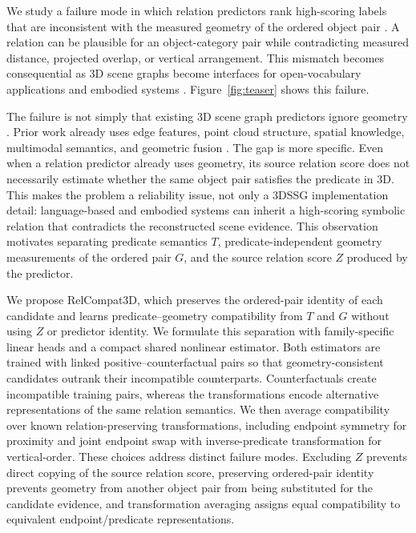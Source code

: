 We study a failure mode in which relation predictors rank high-scoring labels that are inconsistent with the measured geometry of the ordered object pair \cite{nguyen2026relwitness,neau2026visual}. A relation can be plausible for an object-category pair while contradicting measured distance, projected overlap, or vertical arrangement. This mismatch becomes consequential as 3D scene graphs become interfaces for open-vocabulary applications and embodied systems \cite{koch2024open3dsg,hou2025fross,zhang2025open,wang2025open,saxena2025zing,fei2026open,madhavaram2026vizor}. Figure~\ref{fig:teaser} shows this failure.

The failure is not simply that existing 3D scene graph predictors ignore geometry \cite{wald2020learning}. Prior work already uses edge features, point cloud structure, spatial knowledge, multimodal semantics, and geometric fusion \cite{zhang2021exploiting,feng20233d,wang2023vl,koch2024sgrec3d,chen2024clip}. The gap is more specific. Even when a relation predictor already uses geometry, its source relation score does not necessarily estimate whether the same object pair satisfies the predicate in 3D. This makes the problem a reliability issue, not only a 3DSSG implementation detail: language-based and embodied systems can inherit a high-scoring symbolic relation that contradicts the reconstructed scene evidence. This observation motivates separating predicate semantics $T$, predicate-independent geometry measurements of the ordered pair $G$, and the source relation score $Z$ produced by the
predictor.

We propose RelCompat3D, which preserves the ordered-pair identity of each candidate and learns predicate--geometry compatibility from $T$ and $G$ without using $Z$ or predictor identity. We formulate this separation with family-specific linear heads and a compact shared nonlinear estimator. Both estimators are trained with linked positive--counterfactual pairs so that geometry-consistent candidates outrank their incompatible counterparts. Counterfactuals create incompatible training pairs, whereas the transformations encode alternative representations of the same relation semantics. We then average compatibility over known relation-preserving transformations, including endpoint symmetry for proximity and joint endpoint swap with inverse-predicate transformation for vertical-order. These choices address distinct failure modes. Excluding $Z$ prevents direct copying of the source relation score, preserving ordered-pair identity prevents geometry from another object pair from being substituted for the candidate evidence, and transformation averaging assigns equal compatibility to equivalent endpoint/predicate representations. 

